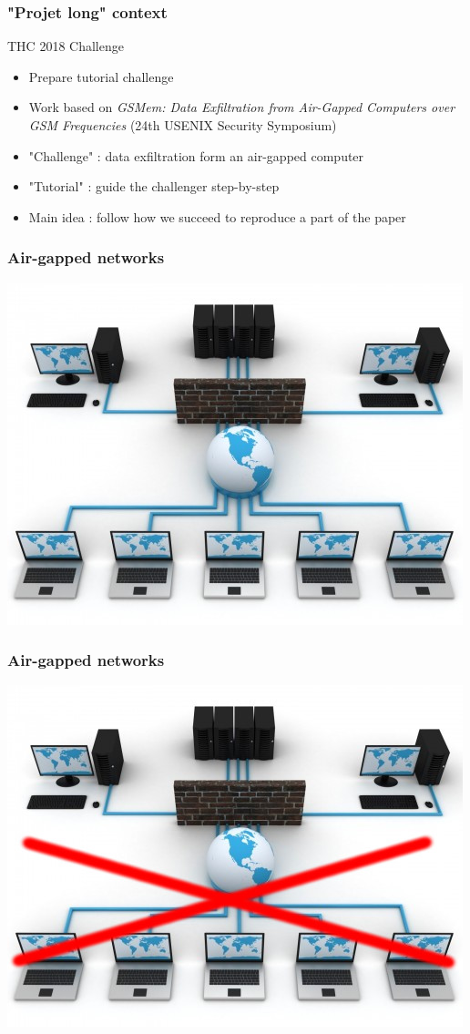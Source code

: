 \begin{frame}
\frametitle{"Projet long" context}
\begin{block}{THC 2018 Challenge}
\begin{itemize}
\item Prepare tutorial challenge
\item Work based on \textit{GSMem: Data Exfiltration from Air-Gapped 
Computers over GSM Frequencies} (24th USENIX Security Symposium)
\item "Challenge" : data exfiltration form an air-gapped computer
\item "Tutorial" : guide the challenger step-by-step
\item Main idea : follow how we succeed to reproduce a part of the paper
\end{itemize}
\end{block}
\end{frame}

\begin{frame}
\frametitle{Air-gapped networks}
\centering \includegraphics[scale=.5]{images/network.jpg}
\end{frame}

\begin{frame}
\frametitle{Air-gapped networks}
\centering \includegraphics[scale=.5]{images/network2.jpg}
\end{frame}

